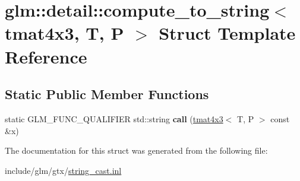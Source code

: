 \hypertarget{structglm_1_1detail_1_1compute__to__string_3_01tmat4x3_00_01T_00_01P_01_4}{}\section{glm\+:\+:detail\+:\+:compute\+\_\+to\+\_\+string$<$ tmat4x3, T, P $>$ Struct Template Reference}
\label{structglm_1_1detail_1_1compute__to__string_3_01tmat4x3_00_01T_00_01P_01_4}
\subsection*{Static Public Member Functions}
\begin{DoxyCompactItemize}
\item 
\mbox{\label{structglm_1_1detail_1_1compute__to__string_3_01tmat4x3_00_01T_00_01P_01_4_a03c7f8dad22b2fbd9a5f90593cffc1a1}} 
static G\+L\+M\+\_\+\+F\+U\+N\+C\+\_\+\+Q\+U\+A\+L\+I\+F\+I\+ER std\+::string {\bfseries call} (\hyperlink{structglm_1_1tmat4x3}{tmat4x3}$<$ T, P $>$ const \&x)
\end{DoxyCompactItemize}


The documentation for this struct was generated from the following file\+:\begin{DoxyCompactItemize}
\item 
include/glm/gtx/\hyperlink{string__cast_8inl}{string\+\_\+cast.\+inl}\end{DoxyCompactItemize}
